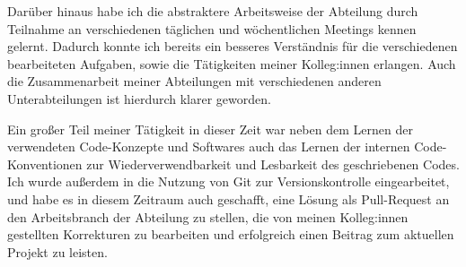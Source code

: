 Darüber hinaus habe ich die abstraktere Arbeitsweise der Abteilung durch Teilnahme an verschiedenen täglichen und wöchentlichen Meetings kennen gelernt. Dadurch konnte ich bereits ein besseres Verständnis für die verschiedenen bearbeiteten Aufgaben, sowie die Tätigkeiten meiner Kolleg:innen erlangen. Auch die Zusammenarbeit meiner Abteilungen mit verschiedenen anderen Unterabteilungen ist hierdurch klarer geworden.

Ein großer Teil meiner Tätigkeit in dieser Zeit war neben dem Lernen der verwendeten Code-Konzepte und Softwares auch das Lernen der internen Code-Konventionen zur Wiederverwendbarkeit und Lesbarkeit des geschriebenen Codes.
Ich wurde außerdem in die Nutzung von Git zur Versionskontrolle eingearbeitet, und habe es in diesem Zeitraum auch geschafft, eine Lösung als Pull-Request an den Arbeitsbranch der Abteilung zu stellen, die von meinen Kolleg:innen gestellten Korrekturen zu bearbeiten und erfolgreich einen Beitrag zum aktuellen Projekt zu leisten.

